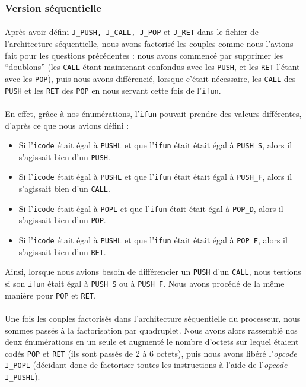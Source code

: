 \documentclass[12pt]{article}
\begin{document}
\subsubsection{Version séquentielle}
\paragraph{}Après avoir défini \verb+J_PUSH, J_CALL, J_POP+ et \verb+J_RET+ dans le fichier de l'architecture séquentielle, nous avons factorisé les couples comme nous l'avions fait pour les questions précédentes : nous avons commencé par supprimer les ``doublons'' (les \verb+CALL+ étant maintenant confondus avec les \verb+PUSH+, et les \verb+RET+ l'étant avec les \verb+POP+), puis nous avons différencié, lorsque c'était nécessaire, les \verb+CALL+ des \verb+PUSH+ et les \verb+RET+ des \verb+POP+ en nous servant cette fois de l'\verb+ifun+.

\paragraph{}En effet, grâce à nos énumérations, l'\verb+ifun+ pouvait prendre des valeurs différentes, d'après ce que nous avions défini :
\begin{itemize}
\item Si l'\verb+icode+ était égal à \verb+PUSHL+ et que l'\verb+ifun+ était était égal à \verb+PUSH_S+, alors il s'agissait bien d'un \verb+PUSH+.
\item Si l'\verb+icode+ était égal à \verb+PUSHL+ et que l'\verb+ifun+ était était égal à \verb+PUSH_F+, alors il s'agissait bien d'un \verb+CALL+.
\item Si l'\verb+icode+ était égal à \verb+POPL+ et que l'\verb+ifun+ était était égal à \verb+POP_D+, alors il s'agissait bien d'un \verb+POP+.
  \item Si l'\verb+icode+ était égal à \verb+PUSHL+ et que l'\verb+ifun+ était était égal à \verb+POP_F+, alors il s'agissait bien d'un \verb+RET+.
\end{itemize} 
Ainsi, lorsque nous avions besoin de différencier un \verb+PUSH+ d'un \verb+CALL+, nous testions si son \verb+ifun+ était égal à \verb+PUSH_S+ ou à \verb+PUSH_F+. Nous avons procédé de la même manière pour \verb+POP+ et \verb+RET+.

\paragraph{}Une fois les couples factorisés dans l'architecture séquentielle du processeur, nous sommes passés à la factorisation par quadruplet. Nous avons alors rassemblé nos deux énumérations en un seule et augmenté le nombre d'octets sur lequel étaient codés \verb+POP+ et \verb+RET+ (ils sont passés de 2 à 6 octets), puis nous avons libéré l'{\itshape opcode} \verb+I_POPL+ (décidant donc de factoriser toutes les instructions à l'aide de l'{\itshape opcode} \verb+I_PUSHL+).
\end{document}
